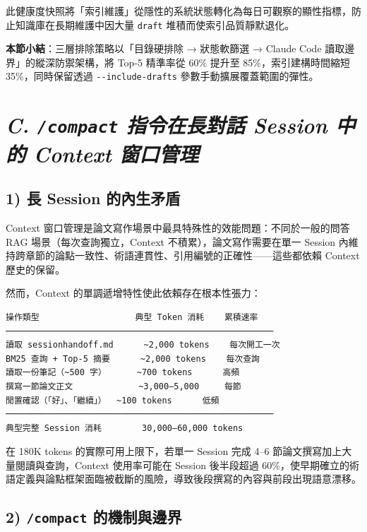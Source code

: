 此健康度快照將「索引維護」從隱性的系統狀態轉化為每日可觀察的顯性指標，防止知識庫在長期維護中因大量
\texttt{draft} 堆積而使索引品質靜默退化。

\textbf{本節小結}：三層排除策略以「目錄硬排除 → 狀態軟篩選 → Claude Code
讀取邊界」的縱深防禦架構，將 Top-5 精準率從 60\% 提升至
85\%，索引建構時間縮短 35\%，同時保留透過 \texttt{-\/-include-drafts}
參數手動擴展覆蓋範圍的彈性。

\section{\texorpdfstring{\emph{C. \texttt{/compact} 指令在長對話 Session
中的 Context
窗口管理}}{C. /compact 指令在長對話 Session 中的 Context 窗口管理}}\label{c.-compact-ux6307ux4ee4ux5728ux9577ux5c0dux8a71-session-ux4e2dux7684-context-ux7a97ux53e3ux7ba1ux7406}

\subsection{1) 長 Session
的內生矛盾}\label{ux9577-session-ux7684ux5167ux751fux77dbux76fe}

Context 窗口管理是論文寫作場景中最具特殊性的效能問題：不同於一般的問答
RAG 場景（每次查詢獨立，Context 不積累），論文寫作需要在單一 Session
內維持跨章節的論點一致性、術語連貫性、引用編號的正確性------這些都依賴
Context 歷史的保留。

然而，Context 的單調遞增特性使此依賴存在根本性張力：

\begin{verbatim}
操作類型                   典型 Token 消耗    累積速率
─────────────────────────────────────────────────────
讀取 sessionhandoff.md      ~2,000 tokens    每次開工一次
BM25 查詢 + Top-5 摘要      ~2,000 tokens    每次查詢
讀取一份筆記（~500 字）      ~700 tokens      高頻
撰寫一節論文正文             ~3,000–5,000     每節
閒置確認（「好」、「繼續」）  ~100 tokens      低頻
─────────────────────────────────────────────────────
典型完整 Session 消耗        30,000–60,000 tokens
\end{verbatim}

在 180K tokens 的實際可用上限下，若單一 Session 完成 4--6
節論文撰寫加上大量閱讀與查詢，Context 使用率可能在 Session 後半段超過
60\%，使早期確立的術語定義與論點框架面臨被截斷的風險，導致後段撰寫的內容與前段出現語意漂移。

\subsection{\texorpdfstring{2) \texttt{/compact}
的機制與邊界}{2) /compact 的機制與邊界}}\label{compact-ux7684ux6a5fux5236ux8207ux908aux754c}

